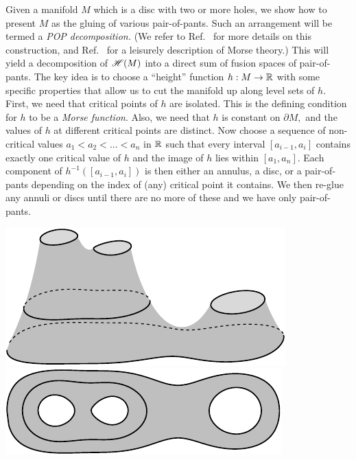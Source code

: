 Given a manifold $M$ which is
a disc with two or more holes, 
we show how to present $M$ as the gluing of various
pair-of-pants. Such an arrangement will be termed a \emph{POP decomposition.}
(We refer to Ref.~\cite{Ivanov2001} for more details on this construction,
and Ref.~\cite{Ghrist2014} for a leisurely description of Morse theory.)
This will yield a decomposition of $\mathscr{H}(M)$ into a direct
sum of fusion spaces of pair-of-pants. %
The key idea is to choose a ``height'' function $h:M\to\mathbb{R}$
with some specific properties that allow us to
cut the manifold up along level sets of $h.$
First, we need that critical points of $h$ are isolated.
This is the defining condition for $h$ to be a \emph{Morse function}.
Also, we need that $h$ is constant on $\partial M,$
and the values of $h$ at different critical points are distinct.
Now choose a sequence of non-critical values $a_1<a_2<...<a_n$ in $\mathbb{R}$
such that every interval $[a_{i-1}, a_i]$ 
contains exactly one critical value of $h$ and the image
of $h$ lies within $[a_1, a_n].$
Each component of $h^{-1}([a_{i-1}, a_i])$ is then either
an annulus, a disc, or a pair-of-pants depending on the index of (any)
critical point it contains.
We then re-glue any annuli or discs until there are no more of these
and we have only pair-of-pants.
\begin{center}
\includegraphics[]{pic-pants.pdf}\ \ \ \ \ \ \ \ \includegraphics[]{pic-pants-1.pdf}
\end{center}

